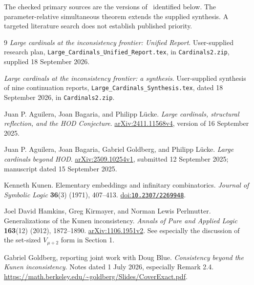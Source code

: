 \documentclass[11pt,letterpaper]{article}
\theoremstyle{definition}
\numberwithin{equation}{section}
\newcommand{\arxiv}[1]{\href{https://arxiv.org/abs/#1}{arXiv:#1}}
\newcommand{\doi}[1]{\href{https://doi.org/#1}{doi:\nolinkurl{#1}}}
\begin{document}
The checked primary sources are the versions of~\cite{ABL,ABGL,HKP,BG} identified below. The parameter-relative simultaneous theorem extends the supplied synthesis. A targeted literature search does not establish published priority.

\begin{thebibliography}{9}
\small
\setlength{\itemsep}{2pt}
\setlength{\parskip}{0pt}
\setlength{\parsep}{0pt}
\emph{Large cardinals at the inconsistency frontier: Unified Report}.
User-supplied research plan, \nolinkurl{Large_Cardinals_Unified_Report.tex}, in \nolinkurl{Cardinals2.zip}, supplied 18 September 2026.

\emph{Large cardinals at the inconsistency frontier: a synthesis}.
User-supplied synthesis of nine continuation reports, \nolinkurl{Large_Cardinals_Synthesis.tex}, dated 18 September 2026, in \nolinkurl{Cardinals2.zip}.

Juan P. Aguilera, Joan Bagaria, and Philipp L\"ucke.
\emph{Large cardinals, structural reflection, and the HOD Conjecture}.
\arxiv{2411.11568v4}, version of 16 September 2025.

Juan P. Aguilera, Joan Bagaria, Gabriel Goldberg, and Philipp L\"ucke.
\emph{Large cardinals beyond HOD}.
\arxiv{2509.10254v1}, submitted 12 September 2025; manuscript dated 15 September 2025.

Kenneth Kunen.
Elementary embeddings and infinitary combinatorics.
\emph{Journal of Symbolic Logic} \textbf{36}(3) (1971), 407--413.
\doi{10.2307/2269948}.

Joel David Hamkins, Greg Kirmayer, and Norman Lewis Perlmutter.
Generalizations of the Kunen inconsistency.
\emph{Annals of Pure and Applied Logic} \textbf{163}(12) (2012), 1872--1890.
\arxiv{1106.1951v2}. See especially the discussion of the set-sized $V_{\mu+2}$ form in Section 1.

Gabriel Goldberg, reporting joint work with Doug Blue.
\emph{Consistency beyond the Kunen inconsistency}.
Notes dated 1 July 2026, especially Remark 2.4.
\url{https://math.berkeley.edu/~goldberg/Slides/CoverExact.pdf}.
\end{thebibliography}
\end{document}
